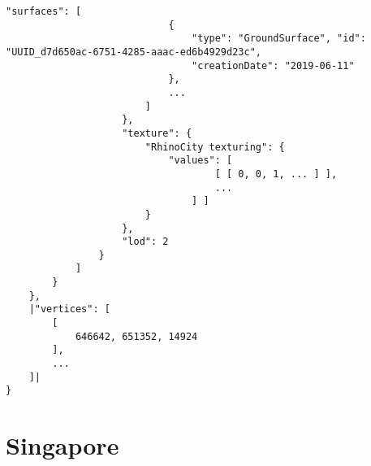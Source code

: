 \begin{scriptsize}
\begin{minipage}[c]{\linewidth / 1}
\begin{lstlisting}[frame=single,style=base,caption={Snippet of Rotterdam dataset}, label=dataset:rotterdam]
                        "surfaces": [
                            {
                                "type": "GroundSurface", "id": "UUID_d7d650ac-6751-4285-aaac-ed6b4929d23c",
                                "creationDate": "2019-06-11"
                            },
                            ...
                        ]
                    },
                    "texture": {
                        "RhinoCity texturing": {
                            "values": [
                                    [ [ 0, 0, 1, ... ] ],
                                    ...
                                ] ]
                        }
                    },
                    "lod": 2
                }
            ]
        }
    },
    |"vertices": [
        [
            646642, 651352, 14924
        ],
        ...
    ]|
}

\end{lstlisting}


\end{minipage}
\end{scriptsize}



\section{Singapore}


